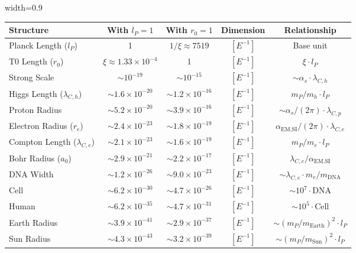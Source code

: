﻿\documentclass[12pt,a4paper]{article}
\newcommand{\tablescale}{0.9}
\begin{document}
\begin{itemize}
	\begin{table}[H]
		\centering
		\begin{adjustbox}{width=\tablescale\textwidth}
			\begin{tabular}{lcccc}
				\toprule
				\textbf{Structure} & \textbf{With \(l_P = 1\)} & \textbf{With \(r_0 = 1\)} & \textbf{Dimension} & \textbf{Relationship} \\
				\midrule
				Planck Length (\(l_P\)) & 1 & \(1/\xi \approx 7519\) & \([E^{-1}]\) & Base unit \\
				T0 Length (\(r_0\)) & \(\xi \approx 1.33 \times 10^{-4}\) & 1 & \([E^{-1}]\) & \(\xi \cdot l_P\) \\
				Strong Scale & \(\sim 10^{-19}\) & \(\sim 10^{-15}\) & \([E^{-1}]\) & \(\sim \alpha_s \cdot \lambda_{C,h}\) \\
				Higgs Length (\(\lambda_{C,h}\)) & \(\sim 1.6 \times 10^{-20}\) & \(\sim 1.2 \times 10^{-16}\) & \([E^{-1}]\) & \(m_P/m_h \cdot l_P\) \\
				Proton Radius & \(\sim 5.2 \times 10^{-20}\) & \(\sim 3.9 \times 10^{-16}\) & \([E^{-1}]\) & \(\sim \alpha_s/(2\pi) \cdot \lambda_{C,p}\) \\
				Electron Radius (\(r_e\)) & \(\sim 2.4 \times 10^{-23}\) & \(\sim 1.8 \times 10^{-19}\) & \([E^{-1}]\) & \(\alpha_{\text{EM,SI}}/(2\pi) \cdot \lambda_{C,e}\) \\
				Compton Length (\(\lambda_{C,e}\)) & \(\sim 2.1 \times 10^{-23}\) & \(\sim 1.6 \times 10^{-19}\) & \([E^{-1}]\) & \(m_P/m_e \cdot l_P\) \\
				Bohr Radius (\(a_0\)) & \(\sim 2.9 \times 10^{-21}\) & \(\sim 2.2 \times 10^{-17}\) & \([E^{-1}]\) & \(\lambda_{C,e}/\alpha_{\text{EM,SI}}\) \\
				DNA Width & \(\sim 1.2 \times 10^{-26}\) & \(\sim 9.0 \times 10^{-23}\) & \([E^{-1}]\) & \(\sim \lambda_{C,e} \cdot m_e/m_{\text{DNA}}\) \\
				Cell & \(\sim 6.2 \times 10^{-30}\) & \(\sim 4.7 \times 10^{-26}\) & \([E^{-1}]\) & \(\sim 10^7 \cdot \text{DNA}\) \\
				Human & \(\sim 6.2 \times 10^{-35}\) & \(\sim 4.7 \times 10^{-31}\) & \([E^{-1}]\) & \(\sim 10^5 \cdot \text{Cell}\) \\
				Earth Radius & \(\sim 3.9 \times 10^{-41}\) & \(\sim 2.9 \times 10^{-37}\) & \([E^{-1}]\) & \(\sim (m_P/m_{\text{Earth}})^2 \cdot l_P\) \\
				Sun Radius & \(\sim 4.3 \times 10^{-43}\) & \(\sim 3.2 \times 10^{-39}\) & \([E^{-1}]\) & \(\sim (m_P/m_{\text{Sun}})^2 \cdot l_P\) \\

\end{tabular}
\end{adjustbox}
\end{table}
\end{itemize}
\end{document}
